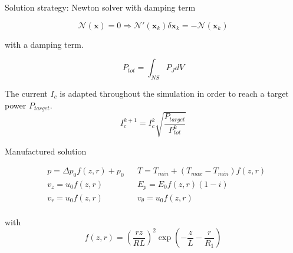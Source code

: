 \documentclass[24pt,t,table, aspectratio=169]{beamer}
\newcommand{\vecx}{\mathbf{x}}
\begin{document}
\begin{frame}{Solution strategy: Newton solver with damping term}

\begin{framed}
\begin{equation*}
\mathcal{N}(\vecx) = 0 \Rightarrow \mathcal{N}'(\vecx_k) \delta \vecx_k = - \mathcal{N}(\vecx_k) 
\end{equation*}
\end{framed}
with a damping term.
\begin{framed}
\begin{equation*}
P_{tot} = \int_{NS} P_J dV
\end{equation*}
\end{framed}
The current $I_c$ is adapted throughout the simulation in order to reach a target power $P_{target}$.
\begin{equation*}
I_c^{k+1} = I_c^k \sqrt{\frac{P_{target}}{P_{tot}^k}}
\end{equation*}



\end{frame}


\begin{frame}{Manufactured solution}

\begin{center}
\end{center}

\begin{equation*}
\begin{aligned}
& p =\Delta p_{0} f(z,r) + p_{0} && T = T_{min} + \left(T_{max} - T_{min}\right) f(z,r)\\
& v_z = u_{0} f(z,r) && E_p = E_{0} f(z,r) (1 - i)\\
& v_r = u_{0} f(z,r) && v_\theta = u_{0} f(z,r) \\
\end{aligned}
\end{equation*}

with 
\begin{equation*}
f(z,r) = \left(\frac{rz}{RL}\right)^2\exp\left(-\frac{z}{L} - \frac{r}{R_1}\right)
\end{equation*}

\end{frame}
\end{document}
